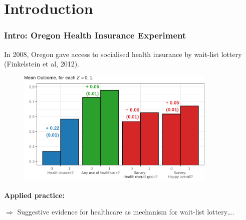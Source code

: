 \documentclass[dvipsnames]{beamer} %
\begin{document}
\section{Introduction}
\begin{frame}
    \frametitle{Intro: Oregon Health Insurance Experiment}
    \vspace{-0.125cm}

    In 2008, Oregon gave access to socialised health insurance by wait-list lottery (Finkelstein et al, 2012).
    
    \vspace{-0.625cm}
    \begin{figure}
        \centering
        \singlespacing
        \includegraphics[width=0.85\textwidth]{
            presentation-files/figures/insurance-effects.png}
    \end{figure}
    \vspace{-0.5cm}

    \textbf{Applied practice:}

    $\Rightarrow$ Suggestive evidence for healthcare as mechanism for wait-list lottery….
\end{frame}
\end{document}
